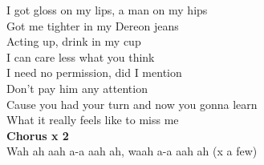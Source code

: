 I got gloss on my lips, a man on my hips\\
Got me tighter in my Dereon jeans\\
Acting up, drink in my cup\\
I can care less what you think\\
I need no permission, did I mention\\
Don't pay him any attention\\
Cause you had your turn and now you gonna learn\\
What it really feels like to miss me\\
\textbf{Chorus x 2}\\
Wah ah aah a-a aah ah, waah a-a aah ah (x a few)\\

